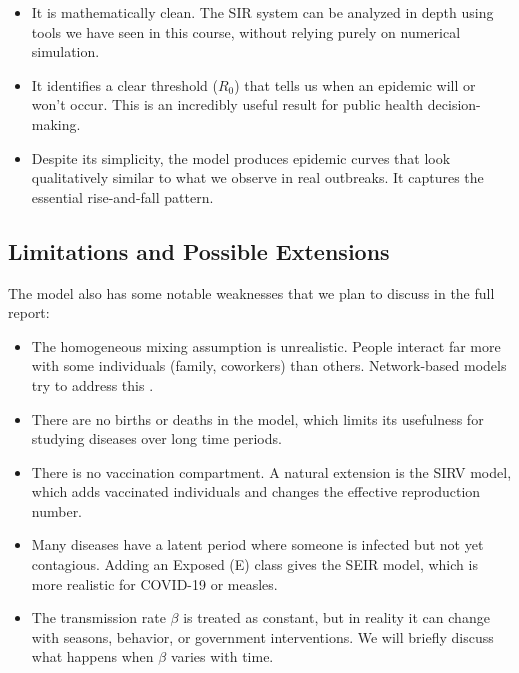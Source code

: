\documentclass[11pt]{article}
\begin{document}
\begin{itemize}
    \item It is mathematically clean. The SIR system can be analyzed in depth using tools we have seen in this course, without relying purely on numerical simulation.
    \item It identifies a clear threshold ($R_0$) that tells us when an epidemic will or won't occur. This is an incredibly useful result for public health decision-making.
    \item Despite its simplicity, the model produces epidemic curves that look qualitatively similar to what we observe in real outbreaks. It captures the essential rise-and-fall pattern.
\end{itemize}

\subsection{Limitations and Possible Extensions}

The model also has some notable weaknesses that we plan to discuss in the full report:

\begin{itemize}
    \item The homogeneous mixing assumption is unrealistic. People interact far more with some individuals (family, coworkers) than others. Network-based models try to address this \cite{brauer2012}.
    \item There are no births or deaths in the model, which limits its usefulness for studying diseases over long time periods.
    \item There is no vaccination compartment. A natural extension is the SIRV model, which adds vaccinated individuals and changes the effective reproduction number.
    \item Many diseases have a latent period where someone is infected but not yet contagious. Adding an Exposed (E) class gives the SEIR model, which is more realistic for COVID-19 or measles.
    \item The transmission rate $\beta$ is treated as constant, but in reality it can change with seasons, behavior, or government interventions. We will briefly discuss what happens when $\beta$ varies with time.
\end{itemize}


\printbibliography
\end{document}
